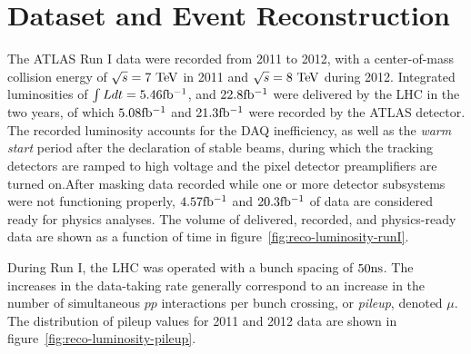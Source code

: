\chapter{Dataset and Event Reconstruction}\label{ch:dataset-reconstruction}
The ATLAS Run I data were recorded from 2011 to 2012, with a center-of-mass collision energy of $\sqrt{s}=7 \TeV$ in 2011 and $\sqrt{s}=8 \TeV$ during 2012. Integrated luminosities of $\int L dt=5.46 \mbox{fb$^{-1}$}$, and $22.8 \mbox{fb$^{-1}$}$ were delivered by the LHC in the two years, of which $5.08 \mbox{fb$^{-1}$}$ and $21.3 \mbox{fb$^{-1}$}$ were recorded by the ATLAS detector. The recorded luminosity accounts for the DAQ inefficiency, as well as the \emph{warm start} period after the declaration of stable beams, during which the tracking detectors are ramped to high voltage and the pixel detector preamplifiers are turned on.After masking data recorded while one or more detector subsystems were not functioning properly, $4.57 \mbox{fb$^{-1}$}$ and $20.3 \mbox{fb$^{-1}$}$ of data are considered ready for physics analyses. The volume of delivered, recorded, and physics-ready data are shown as a function of time in figure~\ref{fig:reco-luminosity-runI}. 

During Run I, the LHC was operated with a bunch spacing of $50 \mathrm{ns}$. The increases in the data-taking rate generally correspond to an increase in the number of simultaneous $pp$ interactions per bunch crossing, or \emph{pileup}, denoted $\mu$. The distribution of pileup values for 2011 and 2012 data are shown in figure~\ref{fig:reco-luminosity-pileup}. 

